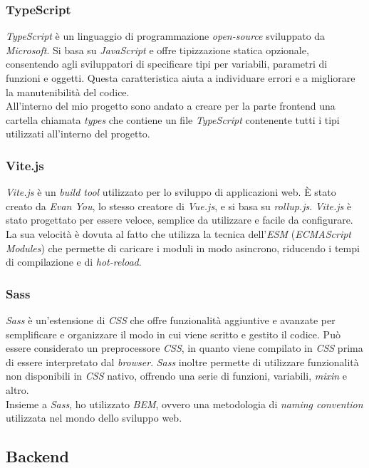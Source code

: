 \subsubsection{TypeScript}\label{subsubsec:TypeScript}
\textit{TypeScript} è un linguaggio di programmazione \textit{open-source} sviluppato da \textit{Microsoft}. Si basa su \textit{JavaScript} e offre tipizzazione statica opzionale, 
consentendo agli sviluppatori di specificare tipi per variabili, parametri di funzioni e oggetti. Questa caratteristica aiuta a individuare errori e a migliorare 
la manutenibilità del codice.\\
All'interno del mio progetto sono andato a creare per la parte frontend una cartella chiamata \textit{types} che contiene un file \textit{TypeScript} contenente tutti i tipi utilizzati all'interno del progetto.
\subsubsection{Vite.js}\label{subsubsec:vite}
\textit{Vite.js} è un \textit{build tool} utilizzato per lo sviluppo di applicazioni web. È stato creato da \textit{Evan You}, lo stesso creatore di \textit{Vue.js}, e si basa su \textit{rollup.js}.
\textit{Vite.js} è stato progettato per essere veloce, semplice da utilizzare e facile da configurare. La sua velocità è dovuta al fatto che utilizza la tecnica dell'\textit{ESM} (\textit{ECMAScript Modules})
che permette di caricare i moduli in modo asincrono, riducendo i tempi di compilazione e di \textit{hot-reload}.
\subsubsection{Sass}\label{subsubsec:Sass}
\textit{Sass} è un'estensione di \textit{CSS} che offre funzionalità aggiuntive e avanzate per semplificare e organizzare il modo in cui viene scritto e gestito il codice.
Può essere considerato un preprocessore \textit{CSS}, in quanto viene compilato in \textit{CSS} prima di essere interpretato dal \textit{browser}. \textit{Sass} inoltre permette di utilizzare funzionalità non disponibili in \textit{CSS} nativo, offrendo una serie di funzioni, variabili, \textit{mixin} e altro.\\
Insieme a \textit{Sass}, ho utilizzato \textit{BEM}, ovvero una metodologia di \textit{naming convention} utilizzata nel mondo dello sviluppo web.

\subsection{Backend}\label{subsec:backend}

